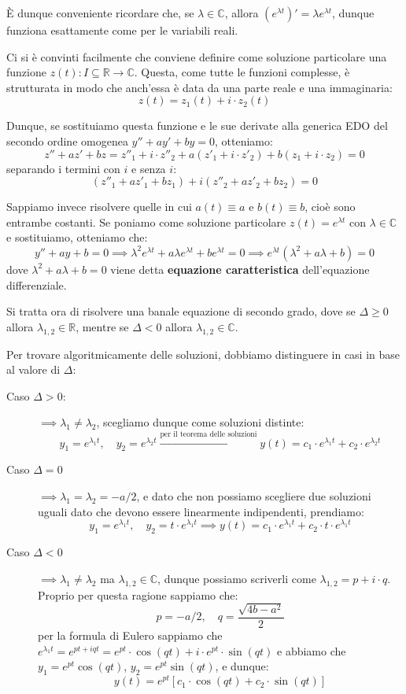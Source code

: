 \documentclass[12pt]{report}
\newcommand{\R}{\mathbb{R}}
\newcommand{\C}{\mathbb{C}}
\begin{document}
	È dunque conveniente ricordare che, se $\lambda \in \mathbb{C}$, allora $(e^{\lambda t})' = \lambda e^{\lambda t}$, dunque funziona esattamente come per le variabili reali.
	
	Ci si è convinti facilmente che conviene definire come soluzione particolare una funzione $z(t) \colon I \subseteq \mathbb{R} \to \mathbb{C}$. Questa, come tutte le funzioni complesse, è strutturata in modo che anch'essa è data da una parte reale e una immaginaria:
	\[
	z(t) = z_1(t) + i \cdot z_2(t)
	\]
	
	Dunque, se sostituiamo questa funzione e le sue derivate alla generica EDO del secondo ordine omogenea $y'' + ay' + by = 0$, otteniamo:
	\[
	z'' + az' + bz = z''_1 + i \cdot z''_2 + a(z'_1 + i \cdot z'_2) + b(z_1 + i \cdot z_2) = 0
	\]
	separando i termini con $i$ e senza $i$:
	\[
	(z''_1 + az'_1 + bz_1) + i(z''_2 + az'_2 + bz_2) = 0
	\]
	
	Sappiamo invece risolvere quelle in cui $a(t) \equiv a$ e $b(t) \equiv b$, cioè sono entrambe costanti.
	Se poniamo come soluzione particolare $z(t) = e^{\lambda t}$ con $\lambda \in \C$ e sostituiamo, otteniamo che:
	\[
	y'' + ay + b = 0 \implies \lambda^2 e^{\lambda t} + a\lambda e^{\lambda t} + b e^{\lambda t} = 0 \implies e^{\lambda t}(\lambda^2 + a\lambda + b) = 0
	\]
	dove $\lambda^2 + a\lambda + b = 0$ viene detta \textbf{equazione caratteristica} dell'equazione differenziale.
	
	Si tratta ora di risolvere una banale equazione di secondo grado, dove se $\Delta \ge 0$ allora $\lambda_{1,2} \in \R$, mentre se $\Delta < 0$ allora $\lambda_{1,2} \in \C$.
	
	Per trovare algoritmicamente delle soluzioni, dobbiamo distinguere in casi in base al valore di $\Delta$:
	\begin{description}
		
		\item [Caso $\Delta > 0$:] $\implies \lambda_1 \neq \lambda_2$, scegliamo dunque come soluzioni distinte:
		\[
		y_1 = e^{\lambda_1 t}, \quad y_2 = e^{\lambda_2 t} \xrightarrow{\text{per il teorema delle soluzioni}} y(t) = c_1 \cdot e^{\lambda_1 t} + c_2 \cdot e^{\lambda_2 t}
		\]
		
		\item [Caso $\Delta = 0$] $\implies \lambda_1 = \lambda_2 = -a/2$, e dato che non possiamo scegliere due soluzioni uguali dato che devono essere linearmente indipendenti, prendiamo:
		\[
		y_1 = e^{\lambda_1 t}, \quad y_2 = t \cdot e^{\lambda_1 t} \implies y(t) = c_1 \cdot e^{\lambda_1 t} + c_2 \cdot t \cdot e^{\lambda_1 t}
		\]
		
		\item [Caso $\Delta < 0$] $\implies \lambda_1 \neq \lambda_2$ ma $\lambda_{1,2} \in \C$, dunque possiamo scriverli come $\lambda_{1,2} = p + i \cdot q$.
		Proprio per questa ragione sappiamo che:
		\[
		p = -a/2, \quad q = \frac{\sqrt{4b - a^2}}{2}
		\]
		per la formula di Eulero sappiamo che $e^{\lambda_1 t} = e^{pt + iqt} = e^{pt} \cdot \cos(qt) + i \cdot e^{pt} \cdot \sin(qt)$ e abbiamo che $y_1 = e^{pt}\cos(qt)$, $y_2 = e^{pt}\sin(qt)$, e dunque:
		\[
		y(t) = e^{pt} [c_1 \cdot \cos(qt) + c_2 \cdot \sin(qt)]
		\]
		
	\end{description}
	
\end{document}
